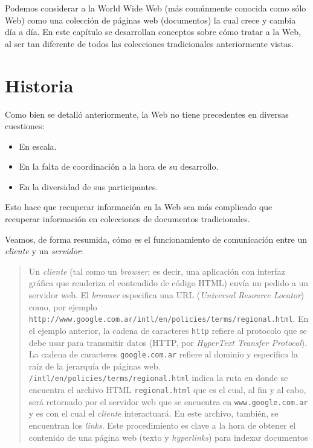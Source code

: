 Podemos considerar a la World Wide Web (más comúnmente conocida como sólo Web) como una colección de páginas web (documentos) la cual crece y cambia día a día. En este capítulo se desarrollan conceptos sobre cómo tratar a la Web, al ser tan diferente de todos las colecciones tradicionales anteriormente vistas.

\section{Historia}
	Como bien se detalló anteriormente, la Web no tiene precedentes en diversas cuestiones:
	\begin{itemize}
		\item En escala.
		\item En la falta de coordinación a la hora de su desarrollo.
		\item En la diversidad de sus participantes.
	\end{itemize}
	Esto hace que recuperar información en la Web sea más complicado que recuperar información en colecciones de documentos tradicionales. \par
	
	Veamos, de forma resumida, cómo es el funcionamiento de comunicación entre un \textit{cliente} y un \textit{servidor}:
	\begin{quotation}
		Un \textit{cliente} (tal como un \textit{browser}; es decir, una aplicación con interfaz gráfica que renderiza el contendido de código HTML) envía un pedido a un servidor web. El \textit{browser} especifica una URL (\textit{Universal Resource Locator}) como, por ejemplo \texttt{http://www.google.com.ar/intl/en/policies/terms/regional.html}. En el ejemplo anterior, la cadena de caracteres \texttt{http} refiere al protocolo que se debe usar para transmitir datos (HTTP, por \textit{HyperText Transfer Protocol}). La cadena de caracteres \texttt{google.com.ar} refiere al dominio y especifica la raíz de la jerarquía de páginas web. \texttt{/intl/en/policies/terms/regional.html} indica la ruta en donde se encuentra el archivo HTML \texttt{regional.html} que es el cual, al fin y al cabo, será retornado por el servidor web que se encuentra en \texttt{www.google.com.ar} y es con el cual el \textit{cliente} interactuará. En este archivo, también, se encuentran los \textit{links}. Este procedimiento es clave a la hora de obtener el contenido de una página web (texto y \textit{hyperlinks}) para indexar documentos
	\end{quotation}
	
